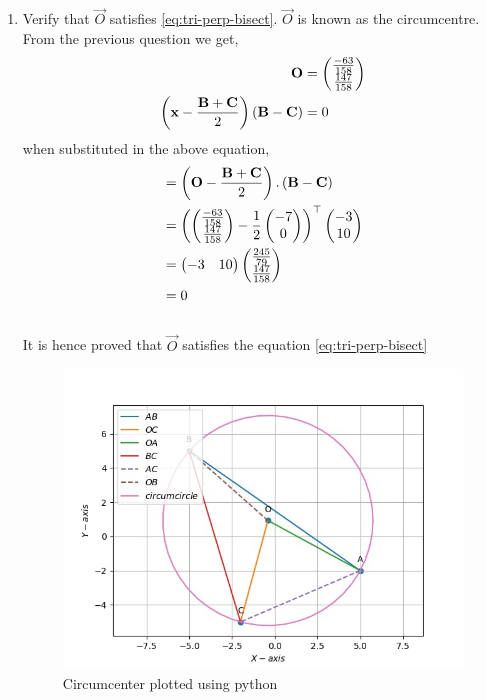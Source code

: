 \documentclass[11pt]{book}
\begin{document}
\begin{enumerate}[label=\thesection.\arabic*.,ref=\thesection.\theenumi]
\item Verify that $\vec{O}$ satisfies
			\eqref{eq:tri-perp-bisect}.
$\vec{O}$ is known as the circumcentre.\\
 \solution
 From the previous question we get,
 \begin{align}
\mathbf{O}&=\begin{pmatrix}\frac{-63}{158}\\ \frac{147}{158}\end{pmatrix} \\
\left(\mathbf{x}-\frac{\mathbf{B}+\mathbf{C}}{2}\right)\left(\mathbf{B}-\mathbf{C}\right) &= 0
\end{align}
when substituted in the above equation,
\begin{align}
	&=\left(\mathbf{O}-\frac{\mathbf{B}+\mathbf{C}}{2}\right).\left(\mathbf{B}-\mathbf{C}\right)\\
	&=\left(\begin{pmatrix}\frac{-63}{158}\\ \frac{147}{158}\end{pmatrix}- \frac{1}{2}\begin{pmatrix}-7\\0\end{pmatrix}\right)^{\top} \begin{pmatrix}-3\\10\end{pmatrix}\\
	&=\begin{pmatrix}-3&10\end{pmatrix}\begin{pmatrix}\frac{245}{79}\\ \frac{147}{158}\end{pmatrix}\\
	&=0
\end{align}
\\
It is hence proved that $\vec{O}$ satisfies the equation \eqref{eq:tri-perp-bisect}
\begin{figure}[H]
\centering
\includegraphics[width=\columnwidth]{figs/third_one.jpg}
\caption{Circumcenter plotted using python}
\label{fig:Circumcenter to BC}
\end{figure}


\end{enumerate}
\end{document}
